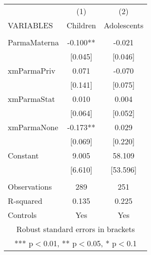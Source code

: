 \begin{tabular}{lcc} \hline
 & (1) & (2) \\
VARIABLES & Children & Adolescents \\ \hline
 &  &  \\
ParmaMaterna & -0.100** & -0.021 \\
 & [0.045] & [0.046] \\
xmParmaPriv & 0.071 & -0.070 \\
 & [0.141] & [0.075] \\
xmParmaStat & 0.010 & 0.004 \\
 & [0.064] & [0.052] \\
xmParmaNone & -0.173** & 0.029 \\
 & [0.069] & [0.220] \\
Constant & 9.005 & 58.109 \\
 & [6.610] & [53.596] \\
 &  &  \\
Observations & 289 & 251 \\
R-squared & 0.135 & 0.225 \\
 Controls & Yes & Yes \\ \hline
\multicolumn{3}{c}{ Robust standard errors in brackets} \\
\multicolumn{3}{c}{ *** p$<$0.01, ** p$<$0.05, * p$<$0.1} \\
\end{tabular}
